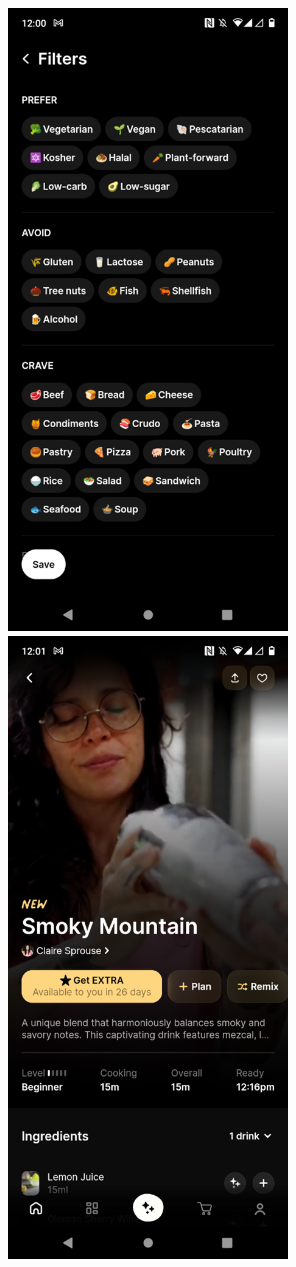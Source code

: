 \documentclass[]{project_interim}
\begin{document}
\begin{figure}[ht!]
  \centering
  \begin{minipage}[t]{0.4\textwidth}
    \includegraphics[width=20em]{cremeImage3.png}
  \end{minipage}
  \hfill
  \begin{minipage}[t]{0.4\textwidth}
    \includegraphics[width=20em]{cremeImage4.png}

\end{minipage}
\end{figure}
\end{document}
